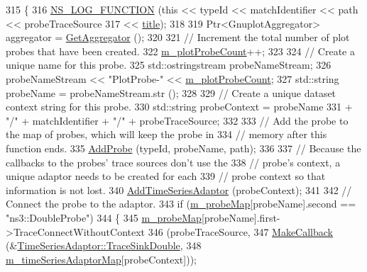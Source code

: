 \begin{DoxyCode}
315 \{
316   \hyperlink{log-macros-disabled_8h_a90b90d5bad1f39cb1b64923ea94c0761}{NS\_LOG\_FUNCTION} (\textcolor{keyword}{this} << typeId << matchIdentifier << path << probeTraceSource
317                         << \hyperlink{lte__link__budget_8m_a5b09b57ee35b13a452f0c089c0709f8b}{title});
318 
319   Ptr<GnuplotAggregator> aggregator = \hyperlink{classns3_1_1GnuplotHelper_af943d55cff587c86db18e813744be45c}{GetAggregator} ();
320 
321   \textcolor{comment}{// Increment the total number of plot probes that have been created.}
322   \hyperlink{classns3_1_1GnuplotHelper_ab674c88bf8c395e601007ecb39b65dbf}{m\_plotProbeCount}++;
323 
324   \textcolor{comment}{// Create a unique name for this probe.}
325   std::ostringstream probeNameStream;
326   probeNameStream << \textcolor{stringliteral}{"PlotProbe-"} << \hyperlink{classns3_1_1GnuplotHelper_ab674c88bf8c395e601007ecb39b65dbf}{m\_plotProbeCount};
327   std::string probeName = probeNameStream.str ();
328 
329   \textcolor{comment}{// Create a unique dataset context string for this probe.}
330   std::string probeContext = probeName
331     + \textcolor{stringliteral}{"/"} + matchIdentifier + \textcolor{stringliteral}{"/"} + probeTraceSource;
332 
333   \textcolor{comment}{// Add the probe to the map of probes, which will keep the probe in}
334   \textcolor{comment}{// memory after this function ends.}
335   \hyperlink{classns3_1_1GnuplotHelper_ad5e798aeffe53074d5792ee2d33561ec}{AddProbe} (typeId, probeName, path);
336 
337   \textcolor{comment}{// Because the callbacks to the probes' trace sources don't use the}
338   \textcolor{comment}{// probe's context, a unique adaptor needs to be created for each}
339   \textcolor{comment}{// probe context so that information is not lost.}
340   \hyperlink{classns3_1_1GnuplotHelper_a3a2ff93dd86e62a0eaef53b559beccf4}{AddTimeSeriesAdaptor} (probeContext);
341 
342   \textcolor{comment}{// Connect the probe to the adaptor.}
343   \textcolor{keywordflow}{if} (\hyperlink{classns3_1_1GnuplotHelper_aa4e50b82ac09e3ec99c1881f37f12ca5}{m\_probeMap}[probeName].second == \textcolor{stringliteral}{"ns3::DoubleProbe"})
344     \{
345       \hyperlink{classns3_1_1GnuplotHelper_aa4e50b82ac09e3ec99c1881f37f12ca5}{m\_probeMap}[probeName].first->TraceConnectWithoutContext
346         (probeTraceSource,
347         \hyperlink{group__makecallbackmemptr_ga9376283685aa99d204048d6a4b7610a4}{MakeCallback} (&\hyperlink{classns3_1_1TimeSeriesAdaptor_a7b5499ffc99cfe741948166ede81980a}{TimeSeriesAdaptor::TraceSinkDouble},
348                       \hyperlink{classns3_1_1GnuplotHelper_ad013691ac007d20ac6c04261dda2432a}{m\_timeSeriesAdaptorMap}[probeContext]));

\end{DoxyCode}
